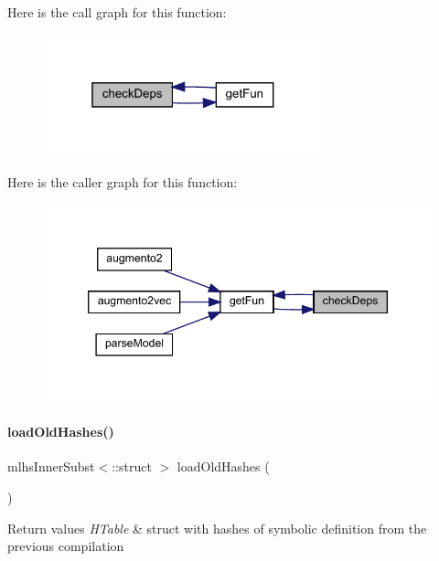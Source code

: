 Here is the call graph for this function\+:
\nopagebreak
\begin{figure}[H]
\begin{center}
\leavevmode
\includegraphics[width=229pt]{classamimodel_ab566026e57f6cbce21a2a2c72b9f7f2b_cgraph}
\end{center}
\end{figure}
Here is the caller graph for this function\+:
\nopagebreak
\begin{figure}[H]
\begin{center}
\leavevmode
\includegraphics[width=346pt]{classamimodel_ab566026e57f6cbce21a2a2c72b9f7f2b_icgraph}
\end{center}
\end{figure}
\mbox{\label{classamimodel_a93346c96338624e417ee9732ffd96b28}} 
\paragraph{\texorpdfstring{loadOldHashes()}{loadOldHashes()}}
{\footnotesize\ttfamily mlhs\+Inner\+Subst$<$\+::struct $>$ load\+Old\+Hashes (\begin{DoxyParamCaption}{ }\end{DoxyParamCaption})}


\begin{DoxyRetVals}{Return values}
{\em H\+Table} & struct with hashes of symbolic definition from the previous compilation \\
\hline
\end{DoxyRetVals}


